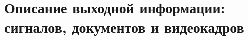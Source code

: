 \documentclass[../nirs.tex]{subfiles}
\begin{document}
\section{Описание выходной информации: сигналов, документов и видеокадров}
\end{document}
